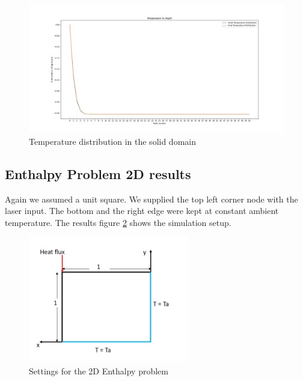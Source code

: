   \begin{figure}[h]
  \centering
  \includegraphics[width=14cm]{img/Stefan_Temperature2.png}
  \caption{Temperature distribution in the solid domain}
  \label{fig:Stefan melt front}
\end{figure}

\subsection{Enthalpy Problem 2D results}
Again we assumed a unit square. We supplied the top left corner node with the laser input. The bottom and the right edge were kept at constant ambient temperature. The results figure \ref{fig:settings for the 2D enthalpy problem} shows the simulation setup. 

\begin{figure}[h]
  \centering
  \includegraphics[width=7cm]{img/2Dsetup.png}
  \caption{Settings for the 2D Enthalpy problem}
  \label{fig:settings for the 2D enthalpy problem}
\end{figure}

